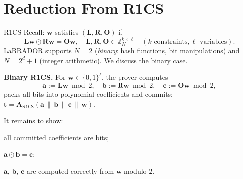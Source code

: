 \documentclass{zkdl-presentation-template}
\begin{document}
    \section{Reduction From R1CS}

    \begin{frame}{R1CS}
        Recall: $\mathbf{w}$ satisfies $(\mathbf{L}, \mathbf{R}, \mathbf{O})$ if
        \begin{equation*}
            \mathbf{L}\mathbf{w} \odot \mathbf{R}\mathbf{w} = \mathbf{O}\mathbf{w}, \quad \mathbf{L}, \mathbf{R}, \mathbf{O} \in \mathbb{Z}_N^{k \times \ell} \quad (k \text{ constraints}, \ell \text{ variables}).
        \end{equation*}
        LaBRADOR supports $N = 2$ (\emph{binary}: hash functions, bit manipulations) and $N = 2^d + 1$ (integer arithmetic). We discuss the binary case.
        \pause

        \textbf{Binary R1CS.} For $\mathbf{w} \in \{0,1\}^{\ell}$, the prover computes
        \begin{equation*}
            \mathbf{a} := \mathbf{L}\mathbf{w} \bmod 2, \quad \mathbf{b} := \mathbf{R}\mathbf{w} \bmod 2, \quad \mathbf{c} := \mathbf{O}\mathbf{w} \bmod 2,
        \end{equation*}
        packs all bits into polynomial coefficients and commits: $\mathbf{t} = \mathbf{A}_{\mathsf{R1CS}}(\mathbf{a}\,\|\,\mathbf{b}\,\|\,\mathbf{c}\,\|\,\mathbf{w})$.
        \pause

        It remains to show:
        \begin{algoen}
            \item all committed coefficients are bits;
            \item $\mathbf{a} \odot \mathbf{b} = \mathbf{c}$;
            \item $\mathbf{a}$, $\mathbf{b}$, $\mathbf{c}$ are computed correctly from $\mathbf{w}$ modulo $2$.
        \end{algoen}
    \end{frame}
\end{document}
